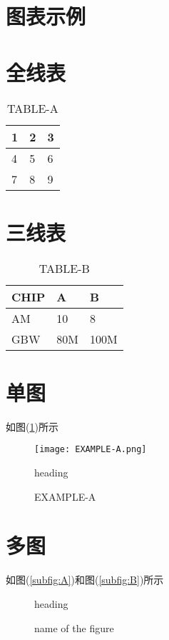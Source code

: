 \section*{图表示例}

\section{全线表}

\begin{table}[H]
	\centering
	\caption{TABLE-A}
	\begin{tabular}{|l|l|l|}
		\hline
		1 & 2 & 3 \\ \hline
		4 & 5 & 6 \\ \hline
		7 & 8 & 9 \\ \hline
	\end{tabular}
\end{table}

\section{三线表}

\begin{table}[H]
	\centering
	\caption{TABLE-B}
	\begin{tabular}{l|l|l}
		\hline
		CHIP & A   & B    \\ \hline
		AM   & 10  & 8    \\ 
		GBW  & 80M & 100M \\ \hline
	\end{tabular}
\end{table}

\section{单图}

如图(\ref{fig:EXAMPLE-A})所示

\begin{figure}[H]
	\centering
	\texttt{[image: EXAMPLE-A.png]}
	\caption*{heading}
	\caption{EXAMPLE-A}
	\label{fig:EXAMPLE-A}
\end{figure}

\section{多图}

如图(\ref{subfig:A})和图(\ref{subfig:B})所示

\begin{figure}[H]
	\centering
	\hspace{0.2\linewidth}
	\caption*{heading}
	\caption{name of the figure}
	\label{fig:multi-image}
\end{figure}

